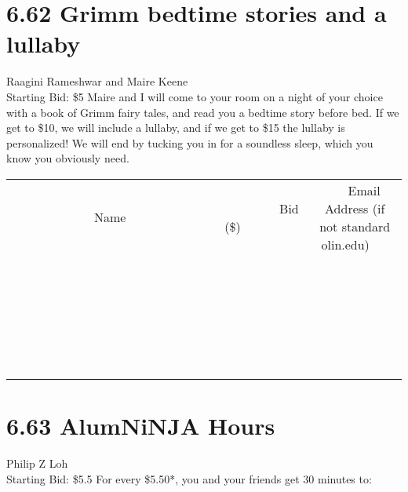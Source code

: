 \documentclass[11pt]{article}
\begin{document}
\section*{6.62 Grimm bedtime stories and a lullaby}
Raagini Rameshwar and Maire Keene
\\
Starting Bid: \$5
\newline
Maire and I will come to your room on a night of your choice with a book of Grimm fairy tales, and read you a bedtime story before bed. If we get to \$10, we will include a lullaby, and if we get to \$15 the lullaby is personalized! We will end by tucking you in for a soundless sleep, which you know you obviously need.
\\[6ex]
\begin{tabular}{c c c}
~~~~~~~~~~~~~Name~~~~~~~~~~~~~ & ~~~~~~~~~Bid (\$)~~~~~~~~~  & ~~~Email Address (if not standard olin.edu)~~~\\
 & & \\
\hline
 & & \\
\hline
 & & \\
\hline
 & & \\
\hline
 & & \\
\hline
 & & \\
\hline
 & & \\
\hline
 & & \\
\hline
 & & \\
\hline
 & & \\
\hline
 & & \\
\hline
 & & \\
\hline
 & & \\
\hline
 & & \\
\hline
 & & \\
\hline
 & & \\
\hline
 & & \\
\hline
 & & \\
\hline
 & & \\
\hline
 & & \\
\hline
 & & \\
\hline
 & & \\
\hline
 & & \\
\hline
 & & \\
\hline
 & & \\
\hline
 & & \\
\hline
\end{tabular}
\newpage
\section*{6.63 AlumNiNJA Hours}
Philip Z Loh
\\
Starting Bid: \$5.5
\newline
For every \$5.50*, you and your friends get 30 minutes to:
\end{document}
